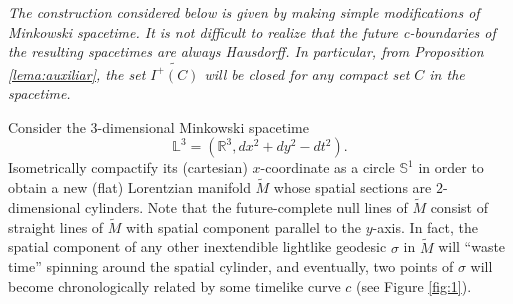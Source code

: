 \begin{note}
\emph{The construction considered below is given by making simple modifications of Minkowski spacetime. It is not difficult to realize that the future c-boundaries of the resulting spacetimes are always Hausdorff. In particular, from Proposition \ref{lema:auxiliar}, the set $\widetilde{I^+(C)}$ will be closed for any compact set $C$ in the spacetime.}
\end{note}





Consider the $3$-dimensional Minkowski spacetime
\[
\mathbb{L}^3 = (\mathbb{R}^3, dx^2+dy^2-dt^{2}).
\]
Isometrically compactify its (cartesian) $x$-coordinate as a circle $\mathbb{S}^1$ in order to obtain a new (flat) Lorentzian manifold $\tilde{M}$ whose spatial sections are $2$-dimensional cylinders. Note that the future-complete null lines of $\tilde{M}$ consist of straight lines of $\tilde{M}$ with spatial component parallel to the $y$-axis. In fact, the spatial component of any other inextendible lightlike geodesic $\sigma$ in $\tilde{M}$ will ``waste time'' spinning around the spatial cylinder, and eventually, two points of $\sigma$ will become chronologically related by some timelike curve $c$ (see Figure \ref{fig:1}).

